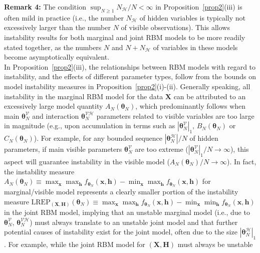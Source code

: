 \documentclass[12pt]{article}
\theoremstyle{definition}
\newcommand{\REP}{\mathrm{LREP}}
\newcommand{\elt}{A_{N}(\boldsymbol \theta_N) }
\newcommand{\Gam}{B_{N}(\boldsymbol \theta_N) }
\newcommand{\Gamc}{C_{N}(\boldsymbol \theta_N) }
\begin{document}
\noindent \textbf{Remark 4:} The condition   $\sup_{N \geq 1} N_{\mathcal{H}}/N<\infty$ in Proposition~\ref{prop2}(iii) is often mild in practice (i.e., the number $N_{\mathcal{H}}$ of hidden variables is typically not excessively larger than the number $N$ of visible observations). This allows instability results for both marginal and joint RBM models to be more readily stated together,  as the numbers $N$ and $N+N_{\mathcal{H}}$ of variables in these models become asymptotically equivalent.  \\

In Proposition~\ref{prop2}(iii), the relationships between RBM models with regard to instability, and the effects of different parameter types, follow from the bounds
on model instability measures in Proposition~\ref{prop2}(i)-(ii).  Generally speaking, all instability in the marginal RBM model for the data $\boldsymbol X$ can be attributed to an excessively large model quantity $\elt  $, which predominantly follows when main $\boldsymbol \theta_N^{\mathcal{V}}$   and interaction $\boldsymbol \theta_N^{\mathcal{VH}}$  parameters related to visible variables are too large in magnitude (e.g., upon accumulation in terms such as $|\boldsymbol \theta_N^{\mathcal{V}}|_1$, $\Gam$ or $\Gamc$).
For example, for any bounded sequence $|\boldsymbol \theta_N^{\mathcal{H}}|/N$ of hidden parameters, if main visible parameters $\boldsymbol \theta_N^{\mathcal{V}}$ are too extreme ($|\boldsymbol \theta_N^{\mathcal{V}}|_1/N\to \infty$), this aspect  will guarantee instability in the visible model ($\elt/N\to \infty$).  In fact, the instability measure $\elt  \equiv   \max_{ \boldsymbol x} \max_{ \boldsymbol h  } f_{\boldsymbol \theta_N} (\boldsymbol x, \boldsymbol h)-\min_{ \boldsymbol x } \max_{ \boldsymbol h }f_{\boldsymbol \theta_N} (\boldsymbol x, \boldsymbol h)$ for marginal/visible model represents a clearly smaller
   portion of the  instability measure
 $\REP_{(\boldsymbol X, \boldsymbol H)}(\boldsymbol \theta_N)\equiv \max_{ \boldsymbol x} \max_{ \boldsymbol h  } f_{\boldsymbol \theta_N} (\boldsymbol x, \boldsymbol h)-\min_{ \boldsymbol x } \min_{ \boldsymbol h }f_{\boldsymbol \theta_N} (\boldsymbol x, \boldsymbol h) $ in the joint RBM model, implying that an unstable marginal model (i.e., due to  $\boldsymbol \theta_N^{\mathcal{V}}$, $\boldsymbol \theta_N^{\mathcal{VH}}$) must always translate to an unstable joint model and that further potential causes of instability exist for the joint model, often due to the size $|\boldsymbol \theta_N^{\mathcal{H}}|_1$.  For example,  while the joint RBM model for    $(\boldsymbol X,\boldsymbol H)$ must always be unstable
\end{document}
